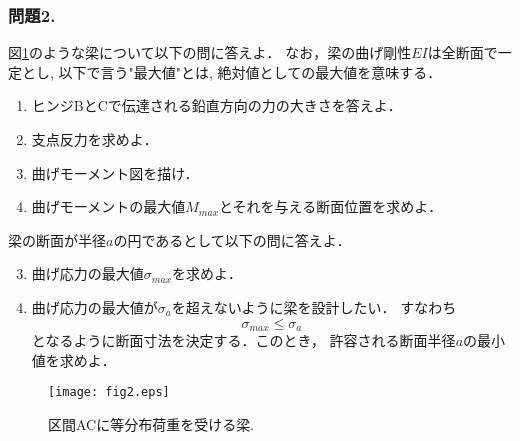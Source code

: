 \documentclass[10pt,a4j]{jarticle}
\begin{document}
\subsubsection*{問題2.}
図\ref{fig:fig2}のような梁について以下の問に答えよ．
なお，梁の曲げ剛性$EI$は全断面で一定とし, 以下で言う"最大値"とは, 
絶対値としての最大値を意味する．
\begin{enumerate}
\item
	ヒンジBとCで伝達される鉛直方向の力の大きさを答えよ．
\item
	支点反力を求めよ．
\item
	曲げモーメント図を描け．
\item
	曲げモーメントの最大値$M_{max}$とそれを与える断面位置を求めよ．
\end{enumerate}
梁の断面が半径$a$の円であるとして以下の問に答えよ．
\begin{enumerate}
\setcounter{enumi}{2}
\item
	曲げ応力の最大値$\sigma_{max}$を求めよ．
\item
	曲げ応力の最大値が$\sigma_a$を超えないように梁を設計したい．
	すなわち
	\[
		\sigma_{max} \leq \sigma_a
	\]
	となるように断面寸法を決定する．このとき，
	許容される断面半径$a$の最小値を求めよ．
\end{enumerate}
\begin{figure}[h]
	\begin{center}
	\texttt{[image: fig2.eps]} 
	\end{center}
	\caption{区間ACに等分布荷重を受ける梁.} 
	\label{fig:fig2}
\end{figure}
\end{document}
